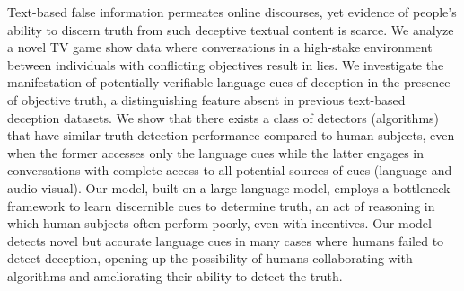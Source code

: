 Text-based false information permeates online discourses, yet evidence of people's ability to discern truth from such deceptive textual content is scarce. We analyze a novel TV game show data where conversations in a high-stake environment between individuals with conflicting objectives result in lies. We investigate the manifestation of potentially verifiable language cues of deception in the presence of objective truth, a distinguishing feature absent in previous text-based deception datasets. We show that there exists a class of detectors (algorithms) that have similar truth detection performance compared to human subjects, even when the former accesses only the language cues while the latter engages in conversations with complete access to all potential sources of cues (language and audio-visual). Our model, built on a large language model, employs a bottleneck framework to learn discernible cues to determine truth, an act of reasoning in which human subjects often perform poorly, even with incentives. Our model detects novel but accurate language cues in many cases where humans failed to detect deception, opening up the possibility of humans collaborating with algorithms and ameliorating their ability to detect the truth.